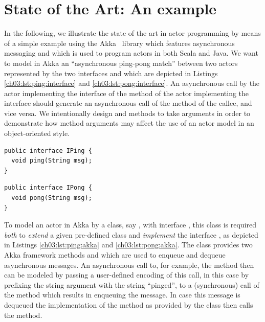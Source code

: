 \section{State of the Art: An example}
\label{ch03:sec:example}
In the following, we illustrate the state of the art in actor programming by means of a simple example using
the Akka~\cite{akka} library which features asynchronous messaging and which is used to program actors in both Scala and Java.
We want to model in Akka an ``asynchronous ping-pong match'' between two actors represented by the 
two interfaces  and  which are depicted in Listings \ref{ch03:lst:ping:interface} and \ref{ch03:lst:pong:interface}.
An asynchronous call by the actor implementing the  interface of the  method of the actor
implementing the  interface should generate an asynchronous call of the  method of the callee,
and vice versa.
We intentionally design  and  methods to take  arguments in order to demonstrate 
how method arguments may affect the use of an actor model in an object-oriented style.





\lstset{language=Java}
\begin{center}
\begin{minipage}[t]{0.48\textwidth}
\begin{lstlisting}[caption=Ping as an interface,label=ch03:lst:ping:interface]
public interface IPing {
  void ping(String msg);
}
\end{lstlisting}
\end{minipage}
\hfill
\begin{minipage}[t]{0.48\textwidth}
\begin{lstlisting}[caption=Pong as an interface,label=ch03:lst:pong:interface]
public interface IPong {
  void pong(String msg);
}
\end{lstlisting}
\end{minipage}
\end{center}

To model an actor in Akka by a class, say  ,  with interface , this class is required  \emph{both} to \emph{extend}
a given pre-defined  class   and \emph{implement} the interface , 
as depicted in Listings \ref{ch03:lst:ping:akka} and \ref{ch03:lst:pong:akka}.
The class  provides two Akka framework methods  and  
which are used to enqueue and dequeue asynchronous messages.
An asynchronous call to, for example,  the method  then can be modeled by passing a user-defined  encoding of this call,
in this case by prefixing the string argument with the string ``pinged'', to a (synchronous) call
of the  method which results in enqueuing the message.
In case this message is dequeued
the implementation of the  method as provided by the  class then calls the  method.

